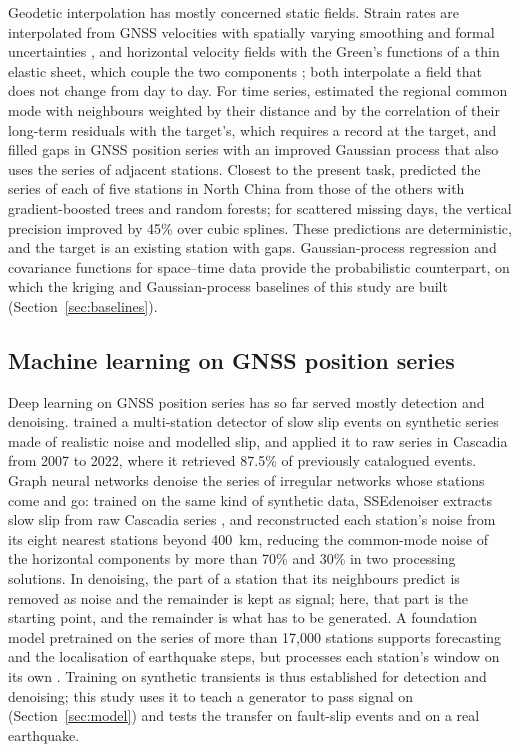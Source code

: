 \documentclass[preprint,12pt,authoryear]{elsarticle}
\begin{document}
Geodetic interpolation has mostly concerned static fields. Strain rates are interpolated
from GNSS velocities with spatially varying smoothing and formal uncertainties
\citep{shen2015}, and horizontal velocity fields with the Green's functions of a thin
elastic sheet, which couple the two components \citep{sandwell2016}; both interpolate a
field that does not change from day to day. For time series, \citet{tian2016} estimated
the regional common mode with neighbours weighted by their distance and by the
correlation of their long-term residuals with the target's, which requires a record at
the target, and \citet{qiu2024} filled gaps in GNSS position series with an improved
Gaussian process that also uses the series of adjacent stations. Closest to the present task,
\citet{li2023interp} predicted the series of each of five stations in North China from
those of the others with gradient-boosted trees and random forests; for scattered missing
days, the vertical precision improved by 45\% over cubic splines. These predictions are
deterministic, and the target is an existing station with gaps. Gaussian-process
regression \citep{rasmussen2006} and covariance functions for space--time data
\citep{gneiting2002} provide the probabilistic counterpart, on which the kriging and
Gaussian-process baselines of this study are built (Section~\ref{sec:baselines}).

\subsection{Machine learning on GNSS position series}

Deep learning on GNSS position series has so far served mostly detection and denoising.
\citet{costantino2023} trained a multi-station detector of slow slip events on synthetic
series made of realistic noise and modelled slip, and applied it to raw series in
Cascadia from 2007 to 2022, where it retrieved 87.5\% of previously catalogued events.
Graph neural networks denoise the series of irregular networks whose stations come and
go: trained on the same kind of synthetic data, SSEdenoiser extracts slow slip from raw
Cascadia series \citep{costantino2024}, and \citet{bachelot2025} reconstructed each
station's noise from its eight nearest stations beyond 400~km, reducing the common-mode
noise of the horizontal components by more than 70\% and 30\% in two processing
solutions. In denoising, the part of a station that its neighbours predict is removed as
noise and the remainder is kept as signal; here, that part is the starting point, and the
remainder is what has to be generated. A foundation model pretrained on the series of
more than 17,000 stations supports forecasting and the localisation of earthquake steps,
but processes each station's window on its own \citep{teutschmann2026gnssfm}. Training on
synthetic transients is thus established for detection and denoising; this study uses it
to teach a generator to pass signal on (Section~\ref{sec:model}) and tests the transfer
on fault-slip events and on a real earthquake.
\end{document}
